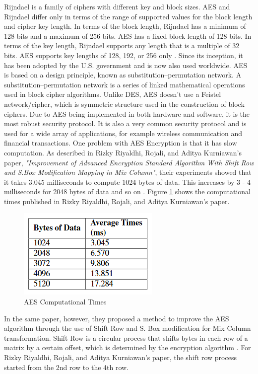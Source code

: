 \documentclass[journal]{IEEEtran}
\begin{document}
\bigskip
Rijndael is a family of ciphers with different key and block sizes. AES and Rijndael differ only in terms of the range of supported values for the block length and cipher key length. In terms of the block length, Rijndael has a minimum of 128 bits and a maximum of 256 bits. AES has a fixed block length of 128 bits. In terms of the key length, Rijndael supports any length that is a multiple of 32 bits. AES supports key lengths of 128, 192, or 256 only \cite{aes_rijndael_length}. Since its inception, it has been adopted by the U.S. government and is now also used worldwide. AES is based on a design principle, known as substitution–permutation network. A substitution–permutation network is a series of linked mathematical operations used in block cipher algorithms. Unlike DES, AES doesn't use a Feistel network/cipher, which is symmetric structure used in the construction of block ciphers. Due to AES being implemented in both hardware and software, it is the most robust security protocol. It is also a very common security protocol and is used for a wide array of applications, for example wireless communication and financial transactions. One problem with AES Encryption is that it has slow computation. As described in Rizky Riyaldhi, Rojali, and Aditya Kurniawan's paper, \textit{"Improvement of Advanced Encryption Standard Algorithm With Shift Row and S.Box Modification Mapping in Mix Column"}, their experiments showed that it takes 3.045 milliseconds to compute 1024 bytes of data. This increases by 3 - 4 milliseconds for 2048 bytes of data and so on \cite{aes_improvement}. Figure \ref{fig:aes_times} shows the computational times published in Rizky Riyaldhi, Rojali, and Aditya Kurniawan's paper.

\newline
\begin{figure}[!h]
    \centering
    \includegraphics[scale=.7]{aes_times}
    \caption{AES Computational Times}
    \label{fig:aes_times}
\end{figure}

In the same paper, however, they proposed a method to improve the AES algorithm through the use of Shift Row and S. Box modification for Mix Column transformation. Shift Row is a circular process that shifts bytes in each row of a matrix by a certain offset, which is determined by the encryption algorithm \cite{shift_row}. For Rizky Riyaldhi, Rojali, and Aditya Kurniawan's paper, the shift row process started from the 2nd row to the 4th row. 
\end{document}

